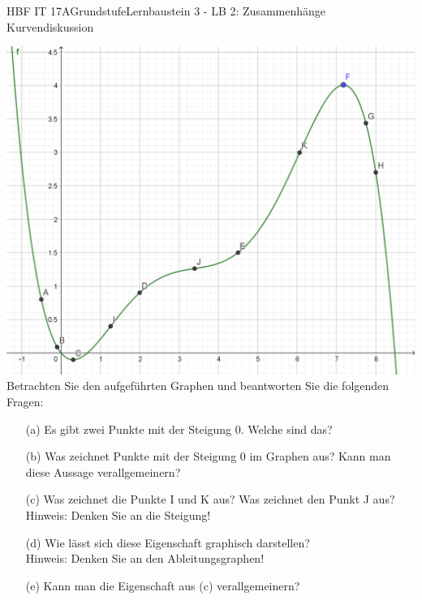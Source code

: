 \documentclass[oneside,openany,headings=optiontotoc,11pt,numbers=noenddot]{scrreprt}
\begin{document}
\begin{worksheet}{HBF IT 17A}{Grundstufe}{Lernbaustein 3 - LB 2: Zusammenhänge Kurvendiskussion}
\begin{framed}
		\end{framed}
		\begin{framed}
			\includegraphics[scale=0.5]{Bilder/fKurv_2.png}
			Betrachten Sie den aufgeführten Graphen und beantworten Sie die folgenden Fragen:
			\begin{itemize}
				\item[(a)] Es gibt zwei Punkte mit der Steigung 0. Welche sind das?
				\item[(b)] Was zeichnet Punkte mit der Steigung 0 im Graphen aus? Kann man diese Aussage verallgemeinern?
				\item[(c)] Was zeichnet die Punkte I und K aus? Was zeichnet den Punkt J aus?\\
				\tiny{Hinweis: Denken Sie an die Steigung!}\normalsize
				\item[(d)] Wie lässt sich diese Eigenschaft graphisch darstellen?\\
				\tiny{Hinweis: Denken Sie an den Ableitungsgraphen!}\normalsize
				\item[(e)] Kann man die Eigenschaft aus (c) verallgemeinern?
			\end{itemize}

\end{framed}
\end{worksheet}
\end{document}
